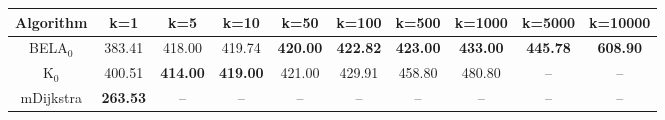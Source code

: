 \begin{tabular}{c|ccccccccc}\toprule
Algorithm & k=1 & k=5 & k=10 & k=50 & k=100 & k=500 & k=1000 & k=5000 & k=10000 \\ \midrule
BELA$_0$ & 383.41 & 418.00 & 419.74 & \textbf{420.00} & \textbf{422.82} & \textbf{423.00} & \textbf{433.00} & \textbf{445.78} & \textbf{608.90} \\
K$_0$ & 400.51 & \textbf{414.00} & \textbf{419.00} & 421.00 & 429.91 & 458.80 & 480.80 & -- & -- \\
mDijkstra & \textbf{263.53} & -- & -- & -- & -- & -- & -- & -- & -- \\ \bottomrule 
\end{tabular}
